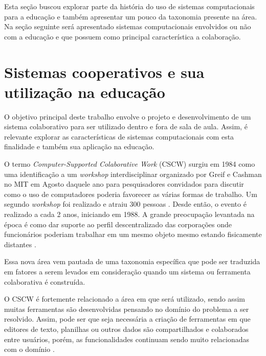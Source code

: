 Esta seção buscou explorar parte da história do uso de sistemas computacionais para a educação e também apresentar um pouco da taxonomia presente na área. Na seção seguinte será apresentado sistemas computacionais envolvidos ou não com a educação e que possuem como principal característica a colaboração.



\section{Sistemas cooperativos e sua utilização na educação}


O objetivo principal deste trabalho envolve o projeto e desenvolvimento de um sistema colaborativo para ser utilizado dentro e fora de sala de aula. Assim, é relevante explorar as características de sistemas computacionais com esta finalidade e também sua aplicação na educação.

O termo \emph{Computer-Supported Colaborative Work} (CSCW) surgiu em 1984 como uma identificação a um \emph{workshop} interdisciplinar organizado por Greif e Cashman no MIT em Agosto daquele ano para pesquisadores convidados para discutir como o uso de computadores poderia favorecer as várias formas de trabalho. Um segundo \emph{workshop} foi realizado e atraiu 300 pessoas \cite{greif1988}. Desde então, o evento é realizado a cada 2 anos, iniciando em 1988. A grande preocupação levantada na época é como dar suporte ao perfil descentralizado das corporações onde funcionários poderiam trabalhar em um mesmo objeto mesmo estando fisicamente distantes \cite{reinhard_cscw_1994}.

Essa nova área vem pautada de uma taxonomia específica que pode ser traduzida em fatores a serem levados em consideração quando um sistema ou ferramenta colaborativa é construída.

O CSCW é fortemente relacionado a área em que será utilizado, sendo assim muitas ferramentas são desenvolvidas pensando no domínio do problema a ser resolvido. Assim, pode ser que seja necessária a criação de ferramentas em que editores de texto, planilhas ou outros dados são compartilhados e colaborados entre usuários, porém, as funcionalidades continuam sendo muito relacionadas com o domínio \cite{reinhard_cscw_1994}.

